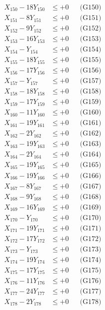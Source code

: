 \documentclass[a4paper,10pt]{article}
\begin{document}
{\begin{align}
X_{150} - 18Y_{150} &\leq +0 && \text{(G150)} \\
X_{151} - 8Y_{151} &\leq +0 && \text{(G151)} \\
X_{152} - 9Y_{152} &\leq +0 && \text{(G152)} \\
X_{153} - 16Y_{153} &\leq +0 && \text{(G153)} \\
X_{154} - Y_{154} &\leq +0 && \text{(G154)} \\
X_{155} - 18Y_{155} &\leq +0 && \text{(G155)} \\
X_{156} - 17Y_{156} &\leq +0 && \text{(G156)} \\
X_{157} - Y_{157} &\leq +0 && \text{(G157)} \\
\allowbreak
X_{158} - 18Y_{158} &\leq +0 && \text{(G158)} \\
X_{159} - 17Y_{159} &\leq +0 && \text{(G159)} \\
X_{160} - 11Y_{160} &\leq +0 && \text{(G160)} \\
X_{161} - 19Y_{161} &\leq +0 && \text{(G161)} \\
X_{162} - 2Y_{162} &\leq +0 && \text{(G162)} \\
X_{163} - 19Y_{163} &\leq +0 && \text{(G163)} \\
X_{164} - 2Y_{164} &\leq +0 && \text{(G164)} \\
X_{165} - 19Y_{165} &\leq +0 && \text{(G165)} \\
X_{166} - 19Y_{166} &\leq +0 && \text{(G166)} \\
X_{167} - 8Y_{167} &\leq +0 && \text{(G167)} \\
\allowbreak
X_{168} - 9Y_{168} &\leq +0 && \text{(G168)} \\
X_{169} - 16Y_{169} &\leq +0 && \text{(G169)} \\
X_{170} - Y_{170} &\leq +0 && \text{(G170)} \\
X_{171} - 19Y_{171} &\leq +0 && \text{(G171)} \\
X_{172} - 17Y_{172} &\leq +0 && \text{(G172)} \\
X_{173} - Y_{173} &\leq +0 && \text{(G173)} \\
X_{174} - 19Y_{174} &\leq +0 && \text{(G174)} \\
X_{175} - 17Y_{175} &\leq +0 && \text{(G175)} \\
X_{176} - 11Y_{176} &\leq +0 && \text{(G176)} \\
X_{177} - 24Y_{177} &\leq +0 && \text{(G177)} \\
\allowbreak
X_{178} - 2Y_{178} &\leq +0 && \text{(G178)} \\

\end{align}}
\end{document}
